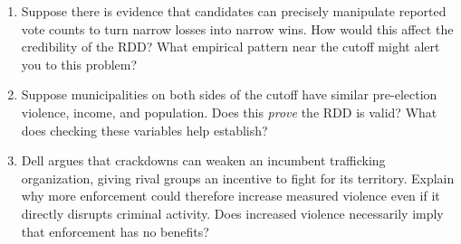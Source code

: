 \documentclass[12pt]{article}
\begin{document}
\begin{enumerate}
\begin{enumerate}
\item A student concludes that reducing anti-drug enforcement would necessarily reduce violence everywhere. Does this follow from the estimate? Explain.
\vspace{1.8cm}
\end{enumerate}
\vspace{8ex}

\item Suppose there is evidence that candidates can precisely manipulate reported vote counts to turn narrow losses into narrow wins. How would this affect the credibility of the RDD? What empirical pattern near the cutoff might alert you to this problem?
\vspace{1.8cm}
\vspace{8ex}

\item Suppose municipalities on both sides of the cutoff have similar pre-election violence, income, and population. Does this \emph{prove} the RDD is valid? What does checking these variables help establish?
\vspace{1.8cm}
\vspace{8ex}

\item Dell argues that crackdowns can weaken an incumbent trafficking organization, giving rival groups an incentive to fight for its territory. Explain why more enforcement could therefore increase measured violence even if it directly disrupts criminal activity. Does increased violence necessarily imply that enforcement has no benefits?
\vspace{8ex}


\end{enumerate}
\end{document}
